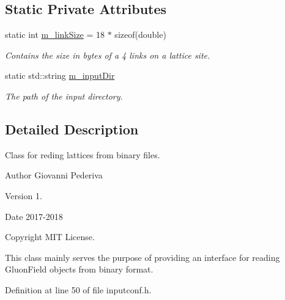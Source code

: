\subsection*{Static Private Attributes}
\begin{DoxyCompactItemize}
\item 
static int \hyperlink{classLatticeIO_1_1InputConf_a1f6a72c39487a0b44cacd27b15a0df0d}{m\+\_\+link\+Size} = 18 $\ast$ sizeof(double)\hypertarget{classLatticeIO_1_1InputConf_a1f6a72c39487a0b44cacd27b15a0df0d}{}\label{classLatticeIO_1_1InputConf_a1f6a72c39487a0b44cacd27b15a0df0d}

\begin{DoxyCompactList}\small\item\em Contains the size in bytes of a 4 links on a lattice site. \end{DoxyCompactList}\item 
static std\+::string \hyperlink{classLatticeIO_1_1InputConf_ac2dcaeda7ddb006f1446b53f5ec6f168}{m\+\_\+input\+Dir}\hypertarget{classLatticeIO_1_1InputConf_ac2dcaeda7ddb006f1446b53f5ec6f168}{}\label{classLatticeIO_1_1InputConf_ac2dcaeda7ddb006f1446b53f5ec6f168}

\begin{DoxyCompactList}\small\item\em The path of the input directory. \end{DoxyCompactList}\end{DoxyCompactItemize}


\subsection{Detailed Description}
Class for reding lattices from binary files. 

\begin{DoxyAuthor}{Author}
Giovanni Pederiva 
\end{DoxyAuthor}
\begin{DoxyVersion}{Version}
1. 
\end{DoxyVersion}
\begin{DoxyDate}{Date}
2017-\/2018 
\end{DoxyDate}
\begin{DoxyCopyright}{Copyright}
M\+IT License.
\end{DoxyCopyright}
This class mainly serves the purpose of providing an interface for reading Gluon\+Field objects from binary format. 

Definition at line 50 of file inputconf.\+h.



